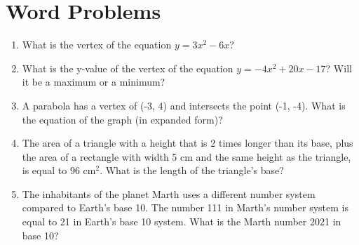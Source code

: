 \documentclass[11pt]{extarticle}
\begin{document}
\section{Word Problems}
\begin{enumerate}
    \itemsep3.5em
    \item {What is the vertex of the equation $y = 3x^2 - 6x$?}
    \item {What is the y-value of the vertex of the equation $y = -4x^2 + 20x - 17$? Will it be a maximum or a minimum?}
    \item {A parabola has a vertex of (-3, 4) and intersects the point (-1, -4). What is the equation of the graph (in expanded form)?}
    \item {The area of a triangle with a height that is 2 times longer than its base, plus the area of a rectangle with width 5 cm and the same height as the triangle, is equal to 96 cm$^2$. What is the length of the triangle's base?}
    \item {The inhabitants of the planet Marth uses a different number system compared to Earth's base 10. The number 111 in Marth's number system is equal to 21 in Earth's base 10 system. What is the Marth number 2021 in base 10?}
\end{enumerate}
\end{document}
